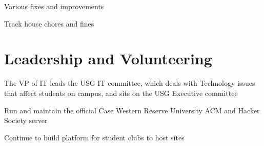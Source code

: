 \documentclass[letterpaper]{deedy-resume} %
\begin{document}
\begin{minipage}[t]{0.66\textwidth}


\begin{tightitemize}
\item Various fixes and improvements
\item Track house chores and fines
\end{tightitemize}

\sectionspace %


\section{Leadership and Volunteering}


\begin{tightitemize}
\item The VP of IT leads the USG IT committee, which deals with Technology
  issues that affect students on campus, and sits on the USG Executive committee
\end{tightitemize}

\sectionspace %



\begin{tightitemize}
\item Run and maintain the official Case Western Reserve University ACM and
  Hacker Society server
\item Continue to build platform for student clubs to host sites
\end{tightitemize}

\sectionspace %


%
%


\end{minipage}
\end{document}
